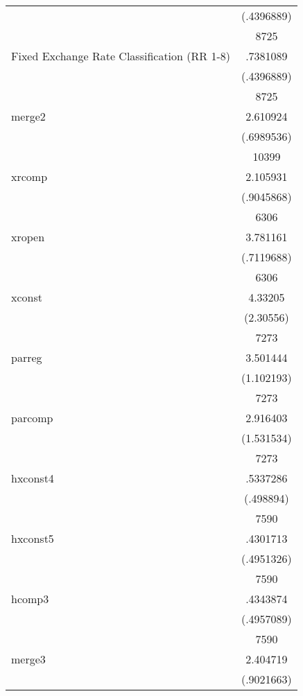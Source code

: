 {\begin{longtable}{l*{1}{c}}
                    &  (.4396889)\\
                    &        8725\\
Fixed Exchange Rate Classification (RR 1-8)&    .7381089\\
                    &  (.4396889)\\
                    &        8725\\
merge2              &    2.610924\\
                    &  (.6989536)\\
                    &       10399\\
xrcomp              &    2.105931\\
                    &  (.9045868)\\
                    &        6306\\
xropen              &    3.781161\\
                    &  (.7119688)\\
                    &        6306\\
xconst              &     4.33205\\
                    &   (2.30556)\\
                    &        7273\\
parreg              &    3.501444\\
                    &  (1.102193)\\
                    &        7273\\
parcomp             &    2.916403\\
                    &  (1.531534)\\
                    &        7273\\
hxconst4            &    .5337286\\
                    &   (.498894)\\
                    &        7590\\
hxconst5            &    .4301713\\
                    &  (.4951326)\\
                    &        7590\\
hcomp3              &    .4343874\\
                    &  (.4957089)\\
                    &        7590\\
merge3              &    2.404719\\
                    &  (.9021663)\\

\end{longtable}}
